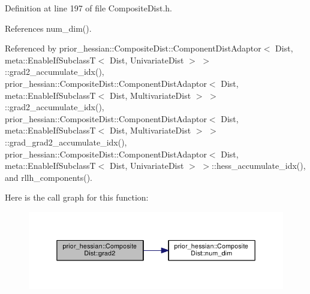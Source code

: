 Definition at line 197 of file Composite\+Dist.\+h.



References num\+\_\+dim().



Referenced by prior\+\_\+hessian\+::\+Composite\+Dist\+::\+Component\+Dist\+Adaptor$<$ Dist, meta\+::\+Enable\+If\+Subclass\+T$<$ Dist, Univariate\+Dist $>$ $>$\+::grad2\+\_\+accumulate\+\_\+idx(), prior\+\_\+hessian\+::\+Composite\+Dist\+::\+Component\+Dist\+Adaptor$<$ Dist, meta\+::\+Enable\+If\+Subclass\+T$<$ Dist, Multivariate\+Dist $>$ $>$\+::grad2\+\_\+accumulate\+\_\+idx(), prior\+\_\+hessian\+::\+Composite\+Dist\+::\+Component\+Dist\+Adaptor$<$ Dist, meta\+::\+Enable\+If\+Subclass\+T$<$ Dist, Multivariate\+Dist $>$ $>$\+::grad\+\_\+grad2\+\_\+accumulate\+\_\+idx(), prior\+\_\+hessian\+::\+Composite\+Dist\+::\+Component\+Dist\+Adaptor$<$ Dist, meta\+::\+Enable\+If\+Subclass\+T$<$ Dist, Univariate\+Dist $>$ $>$\+::hess\+\_\+accumulate\+\_\+idx(), and rllh\+\_\+components().



Here is the call graph for this function\+:\nopagebreak
\begin{figure}[H]
\begin{center}
\leavevmode
\includegraphics[width=350pt]{classprior__hessian_1_1CompositeDist_a90a25995e3e72cc958f188c78fc76d92_cgraph}
\end{center}
\end{figure}




